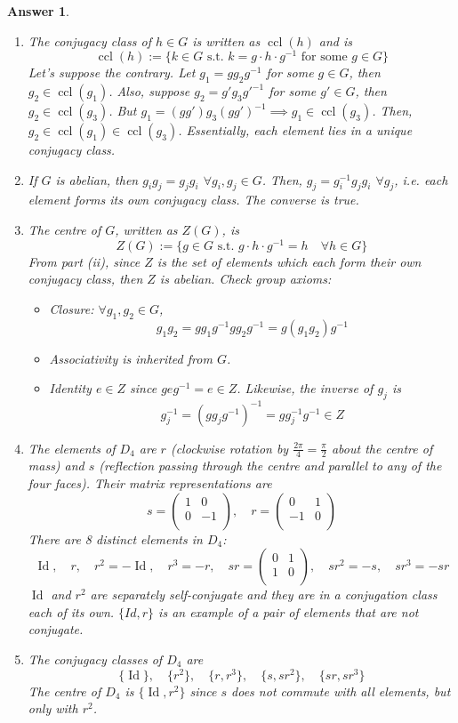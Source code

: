 \documentclass[a4paper]{article}
\DeclareMathOperator{\ccl}{ccl}
\DeclareMathOperator{\Id}{Id}
\newtheorem{ans}{Answer}[section]
\theoremstyle{new}
\begin{document}
\begin{ans}\leavevmode
\begin{enumerate}[label=(\roman*)]
\item The conjugacy class of $h\in G$ is written as $\ccl(h)$ and is
$$\ccl(h):=\{k\in G\text{ s.t. }k=g\cdot h\cdot g^{-1}\text{ for some }g\in G\}$$
Let's suppose the contrary. Let $g_1=gg_2g^{-1}$ for some $g\in G$, then $g_2\in\ccl(g_1)$. Also, suppose $g_2=g'g_3g'^{-1}$ for some $g'\in G$, then $g_2\in\ccl(g_3)$. But $g_1=(gg')g_3(gg')^{-1}\implies g_1\in\ccl(g_3)$. Then, $g_2\in\ccl(g_1)\in\ccl(g_3)$. Essentially, each element lies in a unique conjugacy class.
\item If $G$ is abelian, then $g_ig_j=g_jg_i$ $\forall g_i,g_j\in G$. Then, $g_j=g_i^{-1}g_jg_i$ $\forall g_j$, i.e. each element forms its own conjugacy class. The converse is true.
\item The centre of $G$, written as $Z(G)$, is
$$Z(G):=\{g\in G\text{ s.t. }g\cdot h\cdot g^{-1}=h\quad \forall h\in G\}$$
From part (ii), since $Z$ is the set of elements which each form their own conjugacy class, then $Z$ is abelian. Check group axioms:
\begin{itemize}
\item Closure: $\forall g_1,g_2\in G$,
$$g_1g_2=gg_1g^{-1}gg_2g^{-1}=g(g_1g_2)g^{-1}$$
\item Associativity is inherited from $G$. \item Identity $e\in Z$ since $geg^{-1}=e\in Z$. Likewise, the inverse of $g_j$ is
$$g_j^{-1}=(gg_jg^{-1})^{-1}=gg_j^{-1}g^{-1}\in Z$$
\end{itemize}
\item The elements of $D_4$ are $r$ (clockwise rotation by $\frac{2\pi}{4}=\frac{\pi}{2}$ about the centre of mass) and $s$ (reflection passing through the centre and parallel to any of the four faces). Their matrix representations are
$$s=\begin{pmatrix}1&0\\0&-1\\\end{pmatrix},\quad r=\begin{pmatrix}0&1\\-1&0\\\end{pmatrix}$$
There are 8 distinct elements in $D_4$:
$$\Id,\quad r,\quad r^2=-\Id,\quad r^3=-r,\quad sr=\begin{pmatrix}0&1\\1&0\\\end{pmatrix},\quad sr^2=-s,\quad sr^3=-sr$$
$\Id$ and $r^2$ are separately self-conjugate and they are in a conjugation class each of its own. $\{Id,r\}$ is an example of a pair of elements that are not conjugate.
\item The conjugacy classes of $D_4$ are
$$\{\Id\},\quad \{r^2\},\quad \{r,r^3\},\quad\{s,sr^2\},\quad\{sr,sr^3\}$$
The centre of $D_4$ is $\{\Id,r^2\}$ since $s$ does not commute with all elements, but only with $r^2$.
\end{enumerate}
\end{ans}
\end{document}

